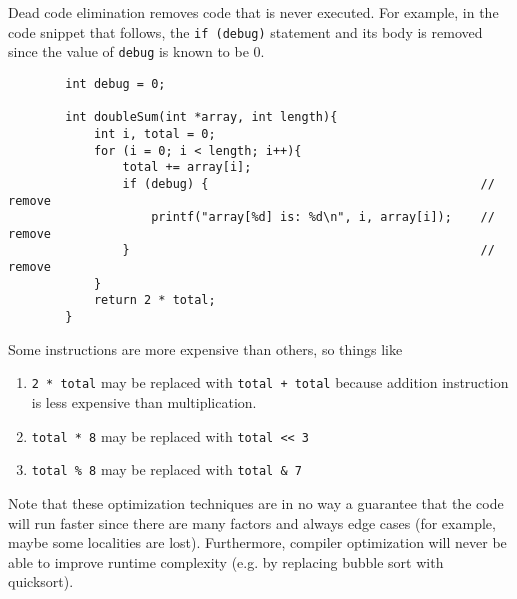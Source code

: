     \begin{definition}
      Dead code elimination removes code that is never executed. For example, in the code snippet that follows, the \texttt{if (debug)} statement and its body is removed since the value of \texttt{debug} is known to be 0.
      \begin{lstlisting}
        int debug = 0;

        int doubleSum(int *array, int length){
            int i, total = 0;
            for (i = 0; i < length; i++){
                total += array[i];
                if (debug) {                                      // remove 
                    printf("array[%d] is: %d\n", i, array[i]);    // remove 
                }                                                 // remove
            }
            return 2 * total;
        }
      \end{lstlisting}
    \end{definition}

    \begin{definition}
      Some instructions are more expensive than others, so things like 
      \begin{enumerate}
        \item \texttt{2 * total} may be replaced with \texttt{total + total} because addition instruction is less expensive than multiplication. 
        \item \texttt{total * 8} may be replaced with \texttt{total << 3} 
        \item \texttt{total \% 8} may be replaced with \texttt{total \& 7}
      \end{enumerate}
    \end{definition}

    Note that these optimization techniques are in no way a guarantee that the code will run faster since there are many factors and always edge cases (for example, maybe some localities are lost). Furthermore, compiler optimization will never be able to improve runtime complexity (e.g. by replacing bubble sort with quicksort). 

